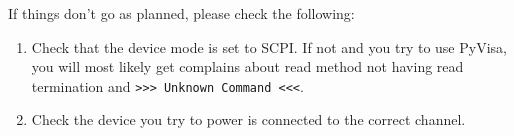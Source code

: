 \documentclass[a4paper,10pt]{article}
\begin{document}
    If things don't go as planned, please check the following:
    \begin{enumerate}
    \item 
        Check that the device mode is set to SCPI. If not and you try to use PyVisa, you will most likely get complains about read method not having read termination and \verb|>>> Unknown Command <<<|.
    \item 
        Check the device you try to power is connected to the correct channel.
    \end{enumerate}
\end{document}

